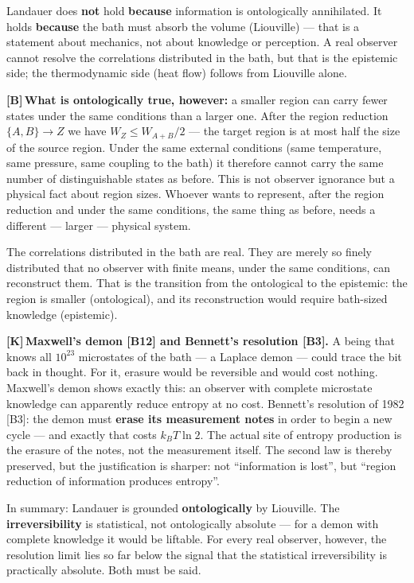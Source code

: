 \documentclass[11pt,a4paper]{article}
\newcommand{\LK}{\textcolor{layK}{\textbf{\footnotesize\textsf{[K]}}}\,}
\newcommand{\LB}{\textcolor{layB}{\textbf{\footnotesize\textsf{[B]}}}\,}
\begin{document}
Landauer does \textbf{not} hold \textbf{because} information is ontologically
annihilated. It holds \textbf{because} the bath must absorb the volume (Liouville)
--- that is a statement about mechanics, not about knowledge or perception. A real
observer cannot resolve the correlations distributed in the bath, but that is the
epistemic side; the thermodynamic side (heat flow) follows from Liouville alone.

\LB \textbf{What is ontologically true, however:} a smaller region can carry fewer
states under the same conditions than a larger one. After the region reduction
$\{A,B\} \to Z$ we have $W_Z \le W_{A+B}/2$ --- the target region is at most half
the size of the source region. Under the same external conditions (same
temperature, same pressure, same coupling to the bath) it therefore cannot carry
the same number of distinguishable states as before. This is not observer
ignorance but a physical fact about region sizes. Whoever wants to represent, after
the region reduction and under the same conditions, the same thing as before,
needs a different --- larger --- physical system.

The correlations distributed in the bath are real. They are merely so finely
distributed that no observer with finite means, under the same conditions, can
reconstruct them. That is the transition from the ontological to the epistemic:
the region is smaller (ontological), and its reconstruction would require
bath-sized knowledge (epistemic).

\LK \textbf{Maxwell's demon [B12] and Bennett's resolution [B3].} A being that
knows all $10^{23}$ microstates of the bath --- a Laplace demon --- could trace
the bit back in thought. For it, erasure would be reversible and would cost
nothing. Maxwell's demon shows exactly this: an observer with complete
microstate knowledge can apparently reduce entropy at no cost. Bennett's
resolution of 1982 [B3]: the demon must \textbf{erase its measurement notes} in
order to begin a new cycle --- and exactly that costs $k_B T \ln 2$. The actual
site of entropy production is the erasure of the notes, not the measurement
itself. The second law is thereby preserved, but the justification is sharper: not
“information is lost”, but “region reduction of information produces entropy”.

In summary: Landauer is grounded \textbf{ontologically} by Liouville. The
\textbf{irreversibility} is statistical, not ontologically absolute --- for a
demon with complete knowledge it would be liftable. For every real observer,
however, the resolution limit lies so far below the signal that the statistical
irreversibility is practically absolute. Both must be said.
\end{document}
